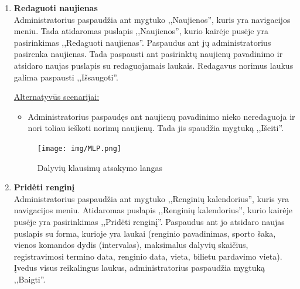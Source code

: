 \documentclass{VUMIFPSkursinis}
\begin{document}
\begin{enumerate} [label = \textbf{U\arabic*.}]
					\underline{Alternatyvūs scenarijai:}
					\begin{itemize}
						\item Administratoriui pasirinkus opciją pasirinkti iš sąrašo. Prie esančių puslapio ,,Naujienos'' naujienų atsiranda varnelės opcija, pažymėjus varneles kairėje pusėje galima paspausti mygtuką ,,Ištrinti''.
						\item Administratoriui suvedus netinkamą pavadinimą, kai pasirinktas pasirinkimas įvesti naujienų pavadinimą, atsirandą užrašas ,,Tokių naujienų nėra.''
					\end{itemize}
				
				\begin{figure}[H]
					\centering
					\texttt{[image: img/MLP.png]}
					\caption{Dalyvių klausimų atsakymo langas}
					\label{fig:atsakyti-klausimus}
				\end{figure}
					
			\item \textbf{Redaguoti naujienas}   \\
					Administratorius paspaudžia  ant mygtuko ,,Naujienos'', kuris yra navigacijos meniu. Tada atidaromas puslapis ,,Naujienos'', kurio kairėje pusėje yra pasirinkimas ,,Redaguoti naujienas''. Paspaudus ant jų administratorius pasirenka naujienas. Tada paspausti ant pasirinktų naujienų pavadinimo ir atsidaro naujas puslapis su redaguojamais laukais. Redagavus norimus laukus galima paspausti ,,Išsaugoti''.
					
					\underline{Alternatyvūs scenarijai:}
					\begin{itemize}
						\item Administratorius paspaudęs ant naujienų pavadinimo nieko neredaguoja ir nori toliau ieškoti norimų naujienų. Tada jis spaudžia mygtuką ,,Išeiti''.
					\end{itemize}
				
				\begin{figure}[H]
					\centering
					\texttt{[image: img/MLP.png]}
					\caption{Dalyvių klausimų atsakymo langas}
					\label{fig:atsakyti-klausimus}
				\end{figure}
				
			\item \textbf{Pridėti renginį}   \\
					Administratorius paspaudžia ant mygtuko ,,Renginių kalendorius'', kuris yra navigacijos meniu. Atidaromas puslapis ,,Renginių kalendorius'', kurio kairėje pusėje yra pasirinkimas ,,Pridėti renginį''. Paspaudus ant jo atsidaro naujas puslapis su forma, kurioje yra laukai (renginio pavadinimas, sporto šaka, vienos komandos dydis (intervalas), maksimalus dalyvių skaičius, registravimosi termino data, renginio data, vieta, bilietu pardavimo vieta). Įvedus visus reikalingus laukus, administratorius paspaudžia mygtuką ,,Baigti''.
					

\end{enumerate}
\end{document}
